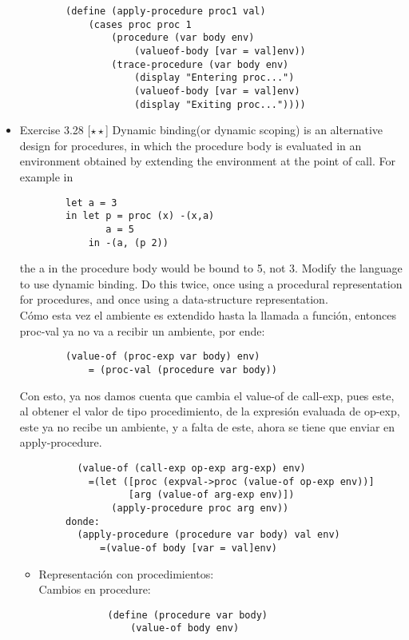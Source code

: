 \documentclass{article}
\begin{document}
\begin{itemize}
\begin{Verbatim}
        (define (apply-procedure proc1 val)
            (cases proc proc 1
                (procedure (var body env)
                    (valueof-body [var = val]env))
                (trace-procedure (var body env)
                    (display "Entering proc...")
                    (valueof-body [var = val]env)
                    (display "Exiting proc..."))))
    \end{Verbatim}
    \item{Exercise 3.28  [$\star \star$] Dynamic binding(or dynamic scoping) is an alternative design for procedures, in which the procedure body is evaluated in an environment obtained by extending the environment at the point of call. For example in}
    \begin{Verbatim}
        let a = 3
        in let p = proc (x) -(x,a)
               a = 5
            in -(a, (p 2))
    \end{Verbatim}
    the a in the procedure body would be bound to 5, not 3. Modify the language to use dynamic binding.  Do this twice, once using a procedural representation for procedures, and once using a data-structure representation.\\
    Cómo esta vez el ambiente es extendido hasta la llamada a función, entonces proc-val ya no va a recibir un ambiente, por ende:
    \begin{Verbatim}
        (value-of (proc-exp var body) env)
            = (proc-val (procedure var body))
    \end{Verbatim}
    Con esto, ya nos damos cuenta que cambia el value-of de call-exp, pues este, al obtener el valor de tipo procedimiento, de la expresión evaluada de op-exp, este ya no recibe un ambiente, y a falta de este, ahora se tiene que enviar en apply-procedure.
    \begin{Verbatim}
          (value-of (call-exp op-exp arg-exp) env)
            =(let ([proc (expval->proc (value-of op-exp env))]
                   [arg (value-of arg-exp env)])
                (apply-procedure proc arg env))
        donde:
          (apply-procedure (procedure var body) val env)
              =(value-of body [var = val]env)
    \end{Verbatim}
    \begin{itemize}
        \item Representación con procedimientos:\\
        Cambios en procedure:
        \begin{Verbatim}
            (define (procedure var body)
                (value-of body env)

\end{Verbatim}
\end{itemize}
\end{itemize}
\end{document}
